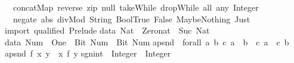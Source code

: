 \begin{isabellebody}
\begin{isamarkuptext}
\ \ concatMap{}\ reverse{}\ zip{}\ null{}\ takeWhile{}\ dropWhile{}\ all{}\ any{}\ Integer{}\isanewline
\ \ negate{}\ abs{}\ divMod{}\ String{}\ Bool{}True{}\ False{}{}\ Maybe{}Nothing{}\ Just{}{}{}\isanewline
import\ qualified\ Prelude{}\isanewline
\isanewline
data\ Nat\ {}\ Zero{}nat\ {}\ Suc\ Nat{}\isanewline
\isanewline
data\ Num\ {}\ One\ {}\ Bit{}\ Num\ {}\ Bit{}\ Num{}\isanewline
\isanewline
apsnd\ {}{}\ forall\ a\ b\ c{}\ {}a\ {}{}\ b{}\ {}{}\ {}c{}\ a{}\ {}{}\ {}c{}\ b{}{}\isanewline
apsnd\ f\ {}x{}\ y{}\ {}\ {}x{}\ f\ y{}{}\isanewline
\isanewline
sgn{}int\ {}{}\ Integer\ {}{}\ Integer{}\isanewline

\end{isamarkuptext}
\end{isabellebody}
